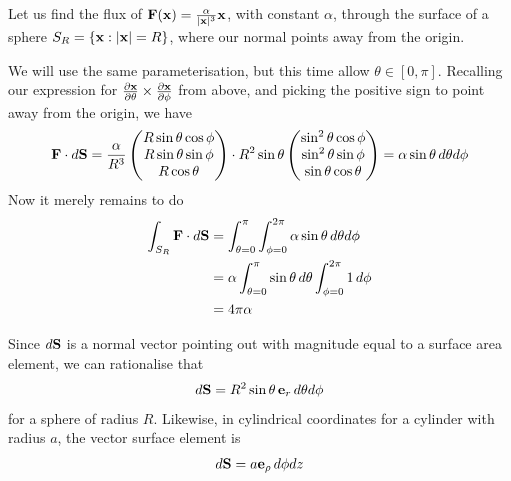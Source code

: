 \documentclass{../template/note}
\begin{document}
    
    \begin{example*}
        Let us find the flux of \(\V F(\V x) = \frac{\alpha}{|\V x|^3} \V x\), with constant \(\alpha\), through the surface of a sphere \(S_R = \{\V x: |\V x| = R\}\), where our normal points away from the origin.

        We will use the same parameterisation, but this time allow \(\theta \in [0, \pi]\). Recalling our expression for \(\pd{\V x}\theta \times \pd{\V x}\phi\) from above, and picking the positive sign to point away from the origin, we have
        \begin{align*}
            \V F \cdot d \V S = \frac{\alpha}{R^3} \begin{pmatrix}
             R \sin \theta \cos \phi \\
             R \sin \theta \sin \phi \\
             R \cos \theta \\
            \end{pmatrix} \cdot R^2 \sin \theta \begin{pmatrix}
             \sin^2 \theta \cos \phi \\
             \sin^2 \theta \sin \phi \\
             \sin \theta \cos \theta \\
            \end{pmatrix} = \alpha \sin \theta \D \theta d\phi
        \end{align*}
        Now it merely remains to do
        \begin{align*}
            \int_{S_R} \V F \cdot d\V S &= \int_{\theta=0}^{\pi} \int_{\phi=0}^{2\pi} \alpha \sin \theta \D \theta d\phi \\
            &= \alpha \int_{\theta=0}^{\pi} \sin \theta \D \theta \int_{\phi=0}^{2\pi} 1 \D \phi \\
            &= 4\pi \alpha
        \end{align*}
    \end{example*}
    
    \begin{remark*}
        Since \(d\V S\) is a normal vector pointing out with magnitude equal to a surface area element, we can rationalise that
        \begin{align*}
            d\V S = R^2 \sin \theta \, \V e_r \D \theta d\phi
        \end{align*}
        for a sphere of radius \(R\). Likewise, in cylindrical coordinates for a cylinder with radius \(a\), the vector surface element is
        \begin{align*}
            d\V S = a \V e_\rho \D \phi dz
        \end{align*}
    \end{remark*}
    
\end{document}
